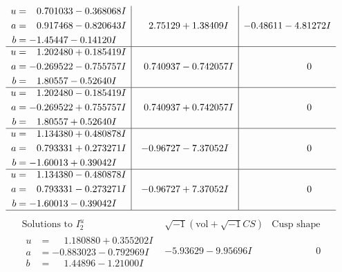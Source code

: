 \documentclass[1p]{elsarticle_modified}
\theoremstyle{definition}
\newcommand{\I}{\sqrt{-1}}
\begin{document}
$$\begin{array}{c|c|c}
\begin{aligned}
u &= \phantom{-}0.701033 - 0.368068 I \\
a &= \phantom{-}0.917468 - 0.820643 I \\
b &= -1.45447 - 0.14120 I\end{aligned}
 & \phantom{-}2.75129 + 1.38409 I & -0.48611 - 4.81272 I \\ \hline\begin{aligned}
u &= \phantom{-}1.202480 + 0.185419 I \\
a &= -0.269522 - 0.755757 I \\
b &= \phantom{-}1.80557 - 0.52640 I\end{aligned}
 & \phantom{-}0.740937 - 0.742057 I & \phantom{-0.000000 } 0 \\ \hline\begin{aligned}
u &= \phantom{-}1.202480 - 0.185419 I \\
a &= -0.269522 + 0.755757 I \\
b &= \phantom{-}1.80557 + 0.52640 I\end{aligned}
 & \phantom{-}0.740937 + 0.742057 I & \phantom{-0.000000 } 0 \\ \hline\begin{aligned}
u &= \phantom{-}1.134380 + 0.480878 I \\
a &= \phantom{-}0.793331 + 0.273271 I \\
b &= -1.60013 + 0.39042 I\end{aligned}
 & -0.96727 - 7.37052 I & \phantom{-0.000000 } 0 \\ \hline\begin{aligned}
u &= \phantom{-}1.134380 - 0.480878 I \\
a &= \phantom{-}0.793331 - 0.273271 I \\
b &= -1.60013 - 0.39042 I\end{aligned}
 & -0.96727 + 7.37052 I & \phantom{-0.000000 } 0\\
 \hline 
 \end{array}$$\newpage$$\begin{array}{c|c|c}  
\text{Solutions to }I^u_{2}& \I (\text{vol} + \sqrt{-1}CS) & \text{Cusp shape}\\
 \hline 
\begin{aligned}
u &= \phantom{-}1.180880 + 0.355202 I \\
a &= -0.883023 - 0.792969 I \\
b &= \phantom{-}1.44896 - 1.21000 I\end{aligned}
 & -5.93629 - 9.95696 I & \phantom{-0.000000 } 0 \\ \hline\begin{aligned}

\end{aligned}
\end{array}$$
\end{document}

